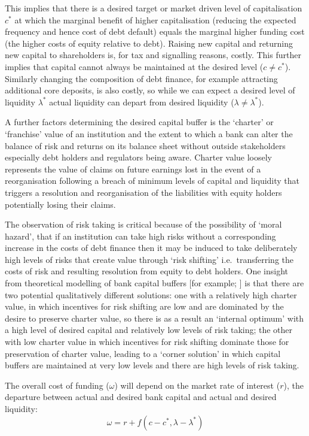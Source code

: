 \documentclass[
  12,
]{article}
\begin{document}
This implies that there is a desired target or market driven level of capitalisation \(c^\ast\) at which the marginal benefit of higher capitalisation (reducing the expected frequency and hence cost of debt default) equals the marginal higher funding cost (the higher costs of equity relative to debt). Raising new capital and returning new capital to shareholders is, for tax and signalling reasons, costly. This further implies that capital cannot always be maintained at the desired level (\(c \neq c^\ast\)). Similarly changing the composition of debt finance, for example attracting additional core deposits, is also costly, so while we can expect a desired level of liquidity \(\lambda^\ast\) actual liquidity can depart from desired liquidity (\(\lambda \neq \lambda^\ast\)).

A further factors determining the desired capital buffer is the `charter' or `franchise' value of an institution and the extent to which a bank can alter the balance of risk and returns on its balance sheet without outside stakeholders especially debt holders and regulators being aware. Charter value loosely represents the value of claims on future earnings lost in the event of a reorganisation following a breach of minimum levels of capital and liquidity that triggers a resolution and reorganisation of the liabilities with equity holders potentially losing their claims.

The observation of risk taking is critical because of the possibility of `moral hazard', that if an institution can take high risks without a corresponding increase in the costs of debt finance then it may be induced to take deliberately high levels of risks that create value through `risk shifting' i.e.~transferring the costs of risk and resulting resolution from equity to debt holders. One insight from theoretical modelling of bank capital buffers {[}for example; \citet{milne2002bank}{]} is that there are two potential qualitatively different solutions: one with a relatively high charter value, in which incentives for risk shifting are low and are dominated by the desire to preserve charter value, so there is as a result an `internal optimum' with a high level of desired capital and relatively low levels of risk taking; the other with low charter value in which incentives for risk shifting dominate those for preservation of charter value, leading to a `corner solution' in which capital buffers are maintained at very low levels and there are high levels of risk taking.

The overall cost of funding (\(\omega\)) will depend on the market rate of interest (\(r\)), the departure between actual and desired bank capital and actual and desired liquidity:
\[
\omega=r+f(c-c^\ast,\lambda-\lambda^\ast ) 
\]
\end{document}
